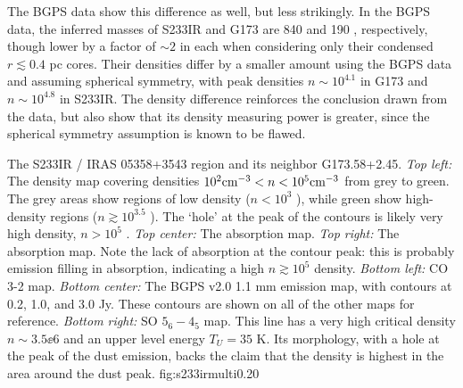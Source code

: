 The BGPS data show this difference as well, but less strikingly.  In the BGPS
data, the inferred masses of S233IR and G173 are 840 and 190 \msun,
respectively, though lower by a factor of $\sim2$ in each when considering only
their condensed $r\lesssim0.4$ pc cores.  Their densities differ by a smaller
amount using the BGPS data and assuming spherical symmetry, with peak densities
$n\sim10^{4.1}$ in G173 and $n\sim10^{4.8}$ in S233IR.  The density difference
reinforces the conclusion drawn from the \formaldehyde data, but also show that its
density measuring power is greater, since the spherical symmetry assumption is known
to be flawed.

%

{The S233IR / IRAS 05358+3543 region and its neighbor G173.58+2.45.
{\it Top left:} The \formaldehyde density map covering densities
$10^2 \textrm{cm}^{-3}<n<10^5 \textrm{cm}^{-3}$ from grey to green.  The grey areas show
regions of low density ($n<10^3$ \percc), while green show high-density
regions ($n\gtrsim10^3.5$ \percc).  The `hole' at the peak of the contours
is likely very high density, $n>10^5$ \percc.
{\it Top center: } The \formaldehyde \oneone absorption map.
{\it Top right: } The \formaldehyde \twotwo absorption map.
Note the lack of absorption at the contour peak: this is probably \twotwo emission
filling in \twotwo absorption, indicating a high $n\gtrsim10^5$ \percc density.
{\it Bottom left: } CO 3-2 map.
{\it Bottom center: } The BGPS v2.0 1.1 mm emission map, with contours at 0.2, 1.0, and 3.0 Jy.
These contours are shown on all of the other maps for reference.
{\it Bottom right: } SO $5_6-4_5$ map.  This line has a very high critical density $n\sim3.5\ee{6}$ \percc
and an upper level energy $T_U=35$ K.
Its morphology, with a hole at the peak of the dust emission, backs the claim that the density is highest
in the area around the dust peak.}
{fig:s233irmulti}{0.2}{0}





